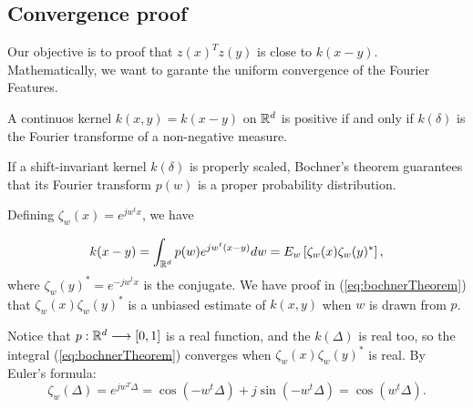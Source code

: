 \subsection{Convergence proof}

Our objective is to proof that $z(x)^Tz(y)$ is close to $k(x-y)$. 
Mathematically, we want to garante the uniform convergence of the Fourier Features. 


\begin{theorem}
    A continuos kernel $k(x,y) = k(x-y)$ on $\mathbb{R}^d$ is positive 
    if and only if $k(\delta)$ is the Fourier transforme of a non-negative measure. 
\end{theorem}

If a shift-invariant kernel $k(\delta)$ is properly scaled, Bochner’s theorem guarantees that its Fourier transform 
$p(w)$
is a proper probability distribution.

Defining $\zeta_w(x) = e^{jw^tx}$, we have

\begin{equation}
    \label{eq:bochnerTheorem}
    k(x-y)
    =
    \int_{\mathbb{R}^d}
    p(w)
    e^{jw^t(x-y)}
    dw
    = 
    E_w\left[
        \zeta_w(x)
        \zeta_w(y)^*
    \right],
\end{equation}
where $\zeta_w(y)^* =  e^{- jw^tx}$ is the conjugate. 
We have proof in (\ref{eq:bochnerTheorem}) that $  \zeta_w(x)
\zeta_w(y)^*$ is a unbiased estimate of $k(x,y)$ when $w$ is drawn from $p$. 

Notice that $p: \mathbb{R}^d \longrightarrow [0,1]$ is a real function, 
and the $k(\Delta)$ is real too, so the integral (\ref{eq:bochnerTheorem})
converges when $\zeta_w(x)
\zeta_w(y)^*$ is real. By Euler's formula: 
\begin{equation}
    \zeta_w(\Delta) 
    = 
    e^{jw^T \Delta} 
    = \cos \left(
        -w^t\Delta
    \right)
    +
    j \sin \left(
        -w^t\Delta
    \right)
    = \cos \left(
        w^t\Delta
    \right).
\end{equation}


